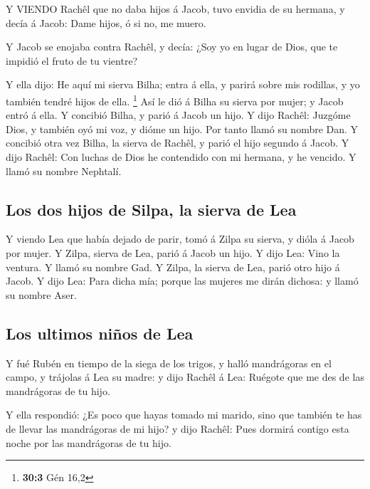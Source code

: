  Y VIENDO Rachêl que no daba hijos á Jacob, tuvo envidia de
su hermana, y decía á Jacob: Dame hijos, ó si no, me muero.

 Y Jacob se enojaba contra Rachêl, y decía: ¿Soy yo en lugar
de Dios, que te impidió el fruto de tu vientre?

 Y ella dijo: He aquí mi sierva Bilha; entra á ella, y
parirá sobre mis rodillas, y yo también tendré hijos de ella.
\footnote{\textbf{30:3} Gén 16,2}  Así le dió á Bilha su
sierva por mujer; y Jacob entró á ella.  Y concibió Bilha, y
parió á Jacob un hijo.  Y dijo Rachêl: Juzgóme Dios, y
también oyó mi voz, y dióme un hijo. Por tanto llamó su nombre Dan.
 Y concibió otra vez Bilha, la sierva de Rachêl, y parió el
hijo segundo á Jacob.  Y dijo Rachêl: Con luchas de Dios he
contendido con mi hermana, y he vencido. Y llamó su nombre Nephtalí.

\hypertarget{los-dos-hijos-de-silpa-la-sierva-de-lea}{%
\subsection{Los dos hijos de Silpa, la sierva de
Lea}\label{los-dos-hijos-de-silpa-la-sierva-de-lea}}

 Y viendo Lea que había dejado de parir, tomó á Zilpa su
sierva, y dióla á Jacob por mujer.  Y Zilpa, sierva de Lea,
parió á Jacob un hijo.  Y dijo Lea: Vino la ventura. Y
llamó su nombre Gad.  Y Zilpa, la sierva de Lea, parió otro
hijo á Jacob.  Y dijo Lea: Para dicha mía; porque las
mujeres me dirán dichosa: y llamó su nombre Aser.

\hypertarget{los-ultimos-niuxf1os-de-lea}{%
\subsection{Los ultimos niños de
Lea}\label{los-ultimos-niuxf1os-de-lea}}

 Y fué Rubén en tiempo de la siega de los trigos, y halló
mandrágoras en el campo, y trájolas á Lea su madre: y dijo Rachêl á Lea:
Ruégote que me des de las mandrágoras de tu hijo.

 Y ella respondió: ¿Es poco que hayas tomado mi marido,
sino que también te has de llevar las mandrágoras de mi hijo? y dijo
Rachêl: Pues dormirá contigo esta noche por las mandrágoras de tu hijo.

